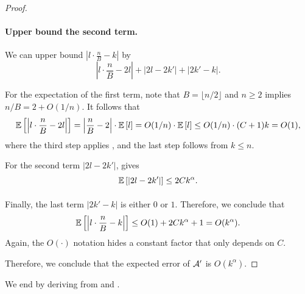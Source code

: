 \begin{proof}
    \paragraph{Upper bound the second term.} We can upper bound $\left|l\cdot \frac{n}{B} - k\right|$ by
    \[
        \left|l\cdot \frac{n}{B} - 2l\right| + |2l - 2k'| + |2k' - k|.
    \]

    For the expectation of the first term, note that $B = \lfloor n/2 \rfloor$ and $n \ge 2$ implies $n / B = 2 + O(1/n)$. It follows that
    \[
        \operatorname*{\mathbb{E}}_{}\left[\left|l\cdot \frac{n}{B} - 2l\right|\right]
    =   \left|\frac{n}{B} - 2\right|\cdot \operatorname*{\mathbb{E}}_{}\left[l\right]
    =   O(1/n) \cdot \operatorname*{\mathbb{E}}_{}\left[l\right]
    \le O(1/n) \cdot (C + 1)k
    =   O(1),
    \]
    where the third step applies , and the last step follows from $k \le n$.
    
    For the second term $|2l - 2k'|$,  gives
    \[
        \operatorname*{\mathbb{E}}_{}\left[|2l - 2k'|\right]
    \le 2Ck^{\alpha}.
    \]
    
    Finally, the last term $|2k' - k|$ is either $0$ or $1$. Therefore, we conclude that
    \[
        \operatorname*{\mathbb{E}}_{}\left[\left|l\cdot \frac{n}{B} - k\right|\right]
    \le O(1) + 2Ck^{\alpha} + 1
    =   O(k^{\alpha}).
    \]
    Again, the $O(\cdot)$ notation hides a constant factor that only depends on $C$.

    Therefore, we conclude that the expected error of $\mathcal{A}'$ is $O(k^{\alpha})$.
\end{proof}

We end by deriving  from  and .

